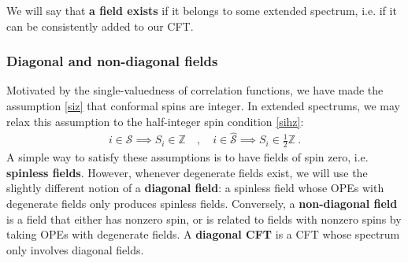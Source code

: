 \documentclass[12pt, a4paper]{article}
\newcommand{\myindex}[1]{\textbf{\boldmath #1}}
\begin{document}
We will say that \myindex{a field exists} if it belongs to some extended spectrum, i.e. if it can be consistently added to our CFT. 

\subsubsection{Diagonal and non-diagonal fields}

Motivated by the single-valuedness of correlation functions, we have made the assumption \eqref{siz} that conformal spins are integer. In extended spectrums, we may relax this assumption to the half-integer spin condition \eqref{sihz}:
\begin{align}
 i\in\mathcal{S}\implies S_i\in\mathbb{Z} \quad , \quad i \in \widehat{\mathcal{S}}\implies S_i\in\frac12\mathbb{Z}\ . 
\end{align}
A simple way to satisfy these assumptions is to have fields of spin zero, i.e. \myindex{spinless fields}. However, whenever degenerate fields exist, we will use the slightly different notion of a \myindex{diagonal field}: a spinless field whose OPEs with degenerate fields only produces spinless fields. Conversely, a \myindex{non-diagonal field} is a field that either has nonzero spin, or is related to fields with nonzero spins by taking OPEs with degenerate fields. A \myindex{diagonal CFT} is a CFT whose spectrum only involves diagonal fields.  
\end{document}
